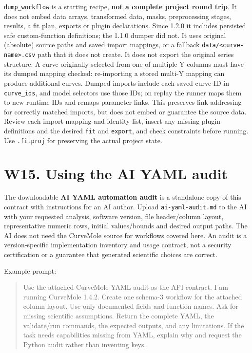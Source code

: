 \documentclass[
  10pt,
  a4paper,
  oneside]{scrreprt}
\begin{document}
\texttt{dump\_workflow} is a starting recipe, \textbf{not a complete
project round trip}. It does not embed data arrays, transformed data,
masks, preprocessing stages, results, a fit plan, exports or plugin
declarations. Since 1.2.0 it includes persisted safe custom-function
definitions; the 1.1.0 dumper did not. It uses original (absolute)
source paths and saved import mappings, or a fallback
\texttt{data/\textless{}curve-name\textgreater{}.csv} path that it does
not create. It does not export the original series structure. A curve
originally selected from one of multiple Y columns must have its dumped
mapping checked: re-importing a stored multi-Y mapping can produce
additional curves. Dumped imports include each saved curve ID in
\texttt{curve\_ids}, and model selectors use those IDs; on replay the
runner maps them to new runtime IDs and remaps parameter links. This
preserves link addressing for correctly matched imports, but does not
embed or guarantee the source data. Review each import mapping and
identity list, insert any missing plugin definitions and the desired
\texttt{fit} and \texttt{export}, and check constraints before running.
Use \texttt{.fitproj} for preserving the actual project state.

\hypertarget{w15.-using-the-ai-yaml-audit}{%
\section{W15. Using the AI YAML
audit}\label{w15.-using-the-ai-yaml-audit}}

The downloadable \textbf{AI YAML automation audit} is a standalone copy
of this contract with instructions for an AI author. Upload
\texttt{ai-yaml-audit.md} to the AI with your requested analysis,
software version, file header/column layout, representative numeric
rows, initial values/bounds and desired output paths. The AI does not
need the CurveMole source for workflows covered here. An audit is a
version-specific implementation inventory and usage contract, not a
security certification or a guarantee that generated scientific choices
are correct.

Example prompt:

\begin{quote}
Use the attached CurveMole YAML audit as the API contract. I am running
CurveMole 1.4.2. Create one schema-3 workflow for the attached column
layout. Use only documented fields and function names. Ask for missing
scientific assumptions. Return the complete YAML, the validate/run
commands, the expected outputs, and any limitations. If the task needs
capabilities missing from YAML, explain why and request the Python audit
rather than inventing keys.
\end{quote}
\end{document}
